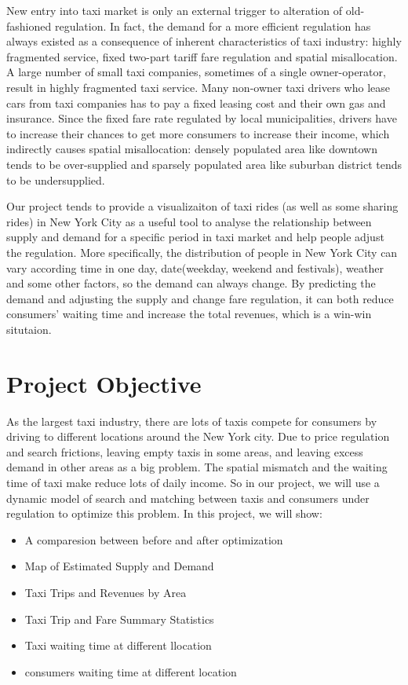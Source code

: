 \documentclass{article}
\begin{document}
            New entry into taxi market is only an external trigger to alteration of old-fashioned regulation. In fact, the demand for a more efficient regulation
            has always existed as a consequence of inherent characteristics of taxi industry: highly fragmented service, fixed two-part tariff fare regulation 
            and spatial misallocation. A large number of small taxi companies, sometimes of a single owner-operator, result in highly fragmented taxi service. Many
            non-owner taxi drivers who lease cars from taxi companies has to pay a fixed leasing cost and their own gas and insurance. Since the fixed fare rate regulated
            by local municipalities, drivers have to increase their chances to get more consumers to increase their income, which indirectly causes spatial misallocation:
            densely populated area like downtown tends to be over-supplied and sparsely populated area like suburban district tends to be undersupplied. 

            Our project tends to provide a visualizaiton of taxi rides (as well as some sharing rides) in New York City as a useful tool to analyse the relationship between
            supply and demand for a specific period in taxi market and help people adjust the regulation. More specifically, the distribution of people in New York City can vary
            according time in one day, date(weekday, weekend and festivals), weather and some other factors, so the demand can always change. By predicting the demand and adjusting
            the supply and change fare regulation, it can both reduce consumers' waiting time and increase the total revenues, which is a win-win situtaion.  

        \section{Project Objective}
            As the largest taxi industry, there are lots of  taxis compete for consumers by driving to different locations around the New York city. Due to  price regulation and search frictions,  leaving empty taxis in some areas, and leaving excess demand in other areas as a big problem. The spatial mismatch and the waiting time of taxi make reduce lots of daily income. So in our project, we will use a dynamic model of search and matching between taxis and consumers under regulation to optimize this problem.
            In this project, we will show:
            \begin{itemize}
                \item A comparesion between before and after optimization
                \item Map of Estimated Supply and Demand
                \item Taxi Trips and Revenues by Area
                \item Taxi Trip and Fare Summary Statistics
                \item Taxi waiting time at different llocation
                \item consumers waiting time at different location
            \end{itemize}
            
\end{document}
